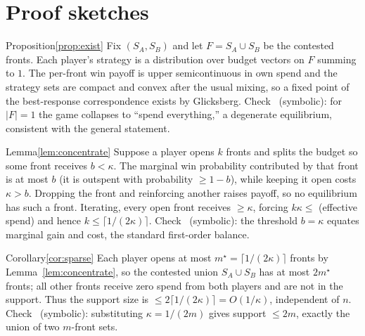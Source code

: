 \section{Proof sketches}\label{app:proofs}

\footnotesize

\begin{myproof}{Proposition}{\ref{prop:exist}}
Fix $(S_A,S_B)$ and let $F=S_A\cup S_B$ be the contested fronts. Each player's
strategy is a distribution over budget vectors on $F$ summing to $1$. The
per-front win payoff is upper semicontinuous in own spend and the strategy sets
are compact and convex after the usual mixing, so a fixed point of the
best-response correspondence exists by Glicksberg. Check \checkmark\ (symbolic):
for $|F|=1$ the game collapses to ``spend everything,'' a degenerate equilibrium,
consistent with the general statement.
\end{myproof}

\begin{myproof}{Lemma}{\ref{lem:concentrate}}
Suppose a player opens $k$ fronts and splits the budget so some front receives
$b<\kappa$. The marginal win probability contributed by that front is at most
$b$ (it is outspent with probability $\ge 1-b$), while keeping it open costs
$\kappa>b$. Dropping the front and reinforcing another raises payoff, so no
equilibrium has such a front. Iterating, every open front receives $\ge\kappa$,
forcing $k\kappa\le$ (effective spend) and hence
$k\le\lceil 1/(2\kappa)\rceil$. Check \checkmark\ (symbolic): the
threshold $b=\kappa$ equates marginal gain and cost, the standard first-order
balance.
\end{myproof}

\begin{myproof}{Corollary}{\ref{cor:sparse}}
Each player opens at most $m^\star=\lceil 1/(2\kappa)\rceil$ fronts by
Lemma~\ref{lem:concentrate}, so the contested union $S_A\cup S_B$ has at most
$2m^\star$ fronts; all other fronts receive zero spend from both players and are
not in the support. Thus the support size is $\le 2\lceil 1/(2\kappa)\rceil =
O(1/\kappa)$, independent of $n$. Check \checkmark\ (symbolic): substituting
$\kappa=1/(2m)$ gives support $\le 2m$, exactly the union of two $m$-front sets.
\end{myproof}

